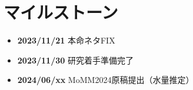 \documentclass[a4j,10pt]{jarticle}
\begin{document}



\section{マイルストーン}
\begin{itemize}
  \item \textbf{2023/11/21} 本命ネタFIX
  \item \textbf{2023/11/30} 研究着手準備完了
  \item \textbf{2024/06/xx} MoMM2024原稿提出（水量推定）
\end{itemize}
\end{document}

